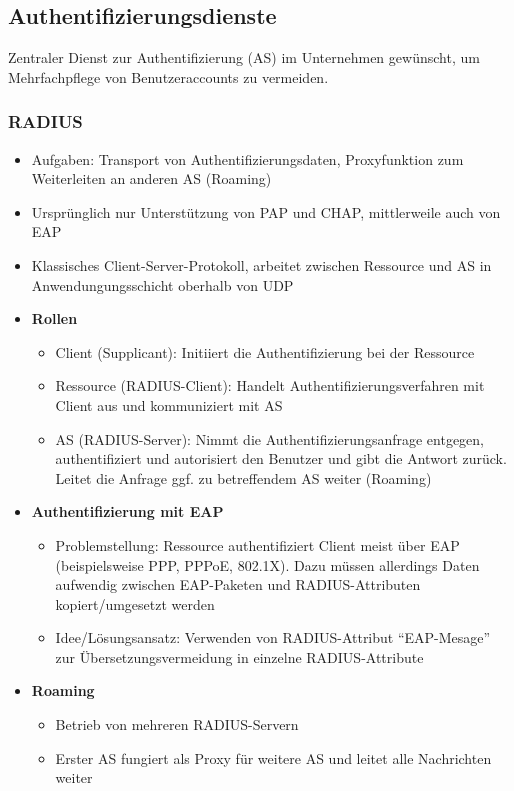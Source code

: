 \subsection{Authentifizierungsdienste}
Zentraler Dienst zur Authentifizierung (AS) im Unternehmen gewünscht, um Mehrfachpflege von Benutzeraccounts zu vermeiden.

\subsubsection{RADIUS}
\begin{itemize}
	\item Aufgaben: Transport von Authentifizierungsdaten, Proxyfunktion zum Weiterleiten an anderen AS (Roaming)
	\item Ursprünglich nur Unterstützung von PAP und CHAP, mittlerweile auch von EAP
	\item Klassisches Client-Server-Protokoll, arbeitet zwischen Ressource und AS in Anwendungungsschicht oberhalb von UDP
	\item \textbf{Rollen}
	\begin{itemize}
		\item Client (Supplicant): Initiiert die Authentifizierung bei der Ressource
		\item Ressource (RADIUS-Client): Handelt Authentifizierungsverfahren mit Client aus und kommuniziert mit AS
		\item AS (RADIUS-Server): Nimmt die Authentifizierungsanfrage entgegen, authentifiziert und autorisiert den Benutzer und gibt die Antwort zurück. Leitet die Anfrage ggf. zu betreffendem AS weiter (Roaming)
	\end{itemize}
	\item \textbf{Authentifizierung mit EAP}
	\begin{itemize}
		\item Problemstellung: Ressource authentifiziert Client meist über EAP (beispielsweise PPP, PPPoE, 802.1X). Dazu müssen allerdings Daten aufwendig zwischen EAP-Paketen und RADIUS-Attributen kopiert/umgesetzt werden
		\item Idee/Lösungsansatz: Verwenden von RADIUS-Attribut "`EAP-Mesage"' zur Übersetzungsvermeidung in einzelne RADIUS-Attribute
	\end{itemize}
	\item \textbf{Roaming}
	\begin{itemize}
		\item Betrieb von mehreren RADIUS-Servern
		\item Erster AS fungiert als Proxy für weitere AS und leitet alle Nachrichten weiter

\end{itemize}
\end{itemize}
